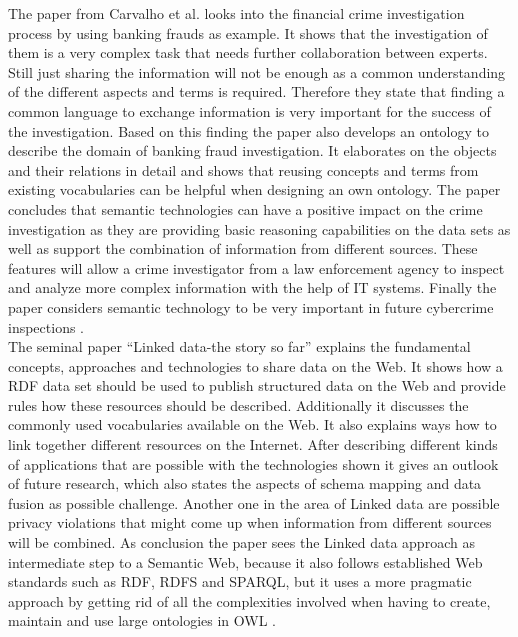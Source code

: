 The paper from Carvalho et al. looks into the financial crime investigation process by using banking frauds as example. It shows that the investigation of them is a very complex task that needs further collaboration between experts. Still just sharing the information will not be enough as a common understanding of the different aspects and terms is required. Therefore they state that finding a common language to exchange information is very important for the success of the investigation. Based on this finding the paper also develops an ontology to describe the domain of banking fraud investigation. It elaborates on the objects and their relations in detail and shows that reusing concepts and terms from existing vocabularies can be helpful when designing an own ontology. The paper concludes that semantic technologies can have a positive impact on the crime investigation as they are providing basic reasoning capabilities on the data sets as well as support the combination of information from different sources. These features will allow a crime investigator from a law enforcement agency to inspect and analyze more complex information with the help of \gls{IT} systems. Finally the paper considers semantic technology to be very important in future cybercrime inspections \citep{carvalhoapplying}. \\

The seminal paper ``Linked data-the story so far'' explains the fundamental concepts, approaches and technologies to share data on the Web. It shows how a \gls{RDF} data set should be used to publish structured data on the Web and provide rules how these resources should be described. Additionally it discusses the commonly used vocabularies available on the Web. It also explains ways how to link together different resources on the Internet. After describing different kinds of applications that are possible with the technologies shown it gives an outlook of future research, which also states the aspects of schema mapping and data fusion as possible challenge. Another one in the area of Linked data are possible privacy violations that might come up when information from different sources will be combined. As conclusion the paper sees the Linked data approach as intermediate step to a Semantic Web, because it also follows established Web standards such as \gls{RDF}, \gls{RDFS} and \gls{SPARQL}, but it uses a more pragmatic approach by getting rid of all the complexities involved when having to create, maintain and use large ontologies in \gls{OWL} \citep{bizer2009linked}. \\

